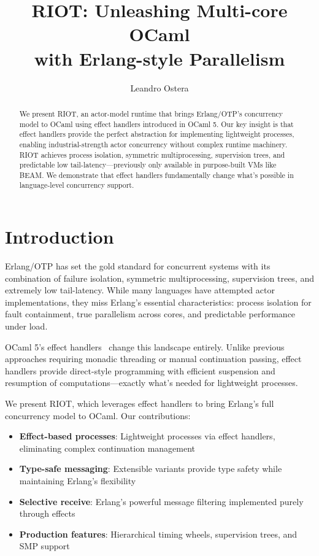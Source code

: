 \documentclass[sigplan,screen,nonacm]{acmart}
\begin{document}
\title{RIOT: Unleashing Multi-core OCaml\\with Erlang-style Parallelism}

\author{Leandro Ostera}

\begin{abstract}
We present RIOT, an actor-model runtime that brings Erlang/OTP's concurrency model to OCaml using effect handlers introduced in OCaml 5. Our key insight is that effect handlers provide the perfect abstraction for implementing lightweight processes, enabling industrial-strength actor concurrency without complex runtime machinery. RIOT achieves process isolation, symmetric multiprocessing, supervision trees, and predictable low tail-latency—previously only available in purpose-built VMs like BEAM. We demonstrate that effect handlers fundamentally change what's possible in language-level concurrency support.
\end{abstract}

\maketitle

\section{Introduction}

Erlang/OTP has set the gold standard for concurrent systems with its combination of failure isolation, symmetric multiprocessing, supervision trees, and extremely low tail-latency. While many languages have attempted actor implementations, they miss Erlang's essential characteristics: process isolation for fault containment, true parallelism across cores, and predictable performance under load.

OCaml 5's effect handlers~\cite{ocaml5effects} change this landscape entirely. Unlike previous approaches requiring monadic threading or manual continuation passing, effect handlers provide direct-style programming with efficient suspension and resumption of computations—exactly what's needed for lightweight processes.

We present RIOT, which leverages effect handlers to bring Erlang's full concurrency model to OCaml. Our contributions:
\begin{itemize}
\item \textbf{Effect-based processes}: Lightweight processes via effect handlers, eliminating complex continuation management
\item \textbf{Type-safe messaging}: Extensible variants provide type safety while maintaining Erlang's flexibility  
\item \textbf{Selective receive}: Erlang's powerful message filtering implemented purely through effects
\item \textbf{Production features}: Hierarchical timing wheels, supervision trees, and SMP support
\end{itemize}
\end{document}
